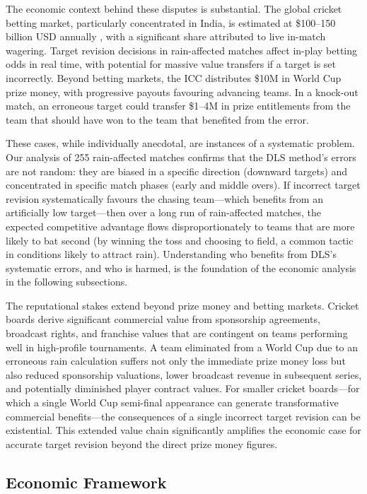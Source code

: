 \documentclass[10pt,a4paper,twocolumn]{article}
\begin{document}
The economic context behind these disputes is substantial. The global cricket betting market, particularly concentrated in India, is estimated at \$100--150 billion USD annually \citep{Howard1966}, with a significant share attributed to live in-match wagering. Target revision decisions in rain-affected matches affect in-play betting odds in real time, with potential for massive value transfers if a target is set incorrectly. Beyond betting markets, the ICC distributes \$10M in World Cup prize money, with progressive payouts favouring advancing teams. In a knock-out match, an erroneous target could transfer \$1--4M in prize entitlements from the team that should have won to the team that benefited from the error.

These cases, while individually anecdotal, are instances of a systematic problem. Our analysis of 255 rain-affected matches confirms that the DLS method's errors are not random: they are biased in a specific direction (downward targets) and concentrated in specific match phases (early and middle overs). If incorrect target revision systematically favours the chasing team---which benefits from an artificially low target---then over a long run of rain-affected matches, the expected competitive advantage flows disproportionately to teams that are more likely to bat second (by winning the toss and choosing to field, a common tactic in conditions likely to attract rain). Understanding who benefits from DLS's systematic errors, and who is harmed, is the foundation of the economic analysis in the following subsections.

The reputational stakes extend beyond prize money and betting markets. Cricket boards derive significant commercial value from sponsorship agreements, broadcast rights, and franchise values that are contingent on teams performing well in high-profile tournaments. A team eliminated from a World Cup due to an erroneous rain calculation suffers not only the immediate prize money loss but also reduced sponsorship valuations, lower broadcast revenue in subsequent series, and potentially diminished player contract values. For smaller cricket boards---for which a single World Cup semi-final appearance can generate transformative commercial benefits---the consequences of a single incorrect target revision can be existential. This extended value chain significantly amplifies the economic case for accurate target revision beyond the direct prize money figures.

\subsection{Economic Framework}
\end{document}
